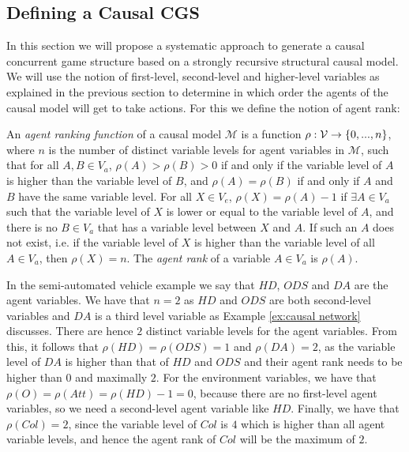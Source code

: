 \subsection{Defining a Causal CGS}
In this section we will propose a systematic approach to generate a causal concurrent game structure based on a strongly recursive structural causal model.
We will use the notion of first-level, second-level and higher-level variables as explained in the previous section to determine in which order the agents of the causal model will get to take actions.
For this we define the notion of agent rank:
\begin{definition}
    An \emph{agent ranking function} of a causal model $\mathcal{M}$ is a function $\rho: \mathcal{V} \rightarrow \{ {0,...,n} \}$, where $n$ is the number of distinct variable levels for agent variables in $\mathcal{M}$, such that for all $A,B \in V_a$, $\rho(A) > \rho(B) > 0$ if and only if the variable level of $A$ is higher than the variable level of $B$, and $\rho(A) = \rho(B)$ if and only if $A$ and $B$ have the same variable level. 
    For all $X \in V_e$, $\rho(X) = \rho(A) - 1$ if $\exists A \in V_a$ such that the variable level of $X$ is lower or equal to the variable level of $A$, and there is no $B \in V_a$ that has a variable level between $X$ and $A$. If such an $A$ does not exist, i.e. if the variable level of $X$ is higher than the variable level of all $A \in V_a$, then $\rho(X) = n$.
    The \emph{agent rank} of a variable $A \in V_a$ is $\rho(A)$.
\end{definition}

\begin{example}\label{ex:agent rank}
    In the semi-automated vehicle example we say that $HD$, $ODS$ and $DA$ are the agent variables. 
    We have that $n = 2$ as $HD$ and $ODS$ are both second-level variables and $DA$ is a third level variable as Example \ref{ex:causal network} discusses. 
    There are hence $2$ distinct variable levels for the agent variables.
    From this, it follows that $\rho(HD) = \rho(ODS) = 1$ and $\rho(DA) = 2$, as the variable level of $DA$ is higher than that of $HD$ and $ODS$ and their agent rank needs to be higher than $0$ and maximally $2$.
    For the environment variables, we have that $\rho(O) = \rho(Att) = \rho(HD) - 1 = 0$, because there are no first-level agent variables, so we need a second-level agent variable like $HD$.
    Finally, we have that $\rho(Col) = 2$, since the variable level of $Col$ is $4$ which is higher than all agent variable levels, and hence the agent rank of $Col$ will be the maximum of $2$.
\end{example}

